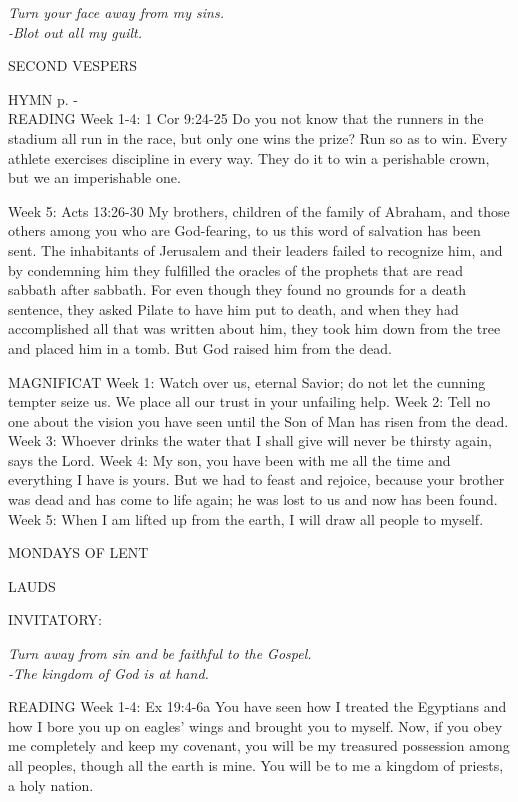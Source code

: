 \begin{center}
\textit{Turn your face away from my sins.\\
-Blot out all my guilt.}\end{center}

\begin{flushleft}\normalsize{\uppercase{SECOND VESPERS\\}}\end{flushleft}
\small{\uppercase{HYMN} p. \pageref{lent:firstHymn}-\pageref{lent:lastHymn}\\}
READING
Week 1-4:  1 Cor 9:24-25  Do you not know that the runners in the stadium all run in the race, but only one wins the prize? Run so as to win. Every athlete exercises discipline in every way. They do it to win a perishable crown, but we an imperishable one.

Week 5:  Acts 13:26-30   My brothers, children of the family of Abraham, and those others among you who are God-fearing, to us this word of salvation has been sent. The inhabitants of Jerusalem and their leaders failed to recognize him, and by condemning him they fulfilled the oracles of the prophets that are read sabbath after sabbath. For even though they found no grounds for a death sentence, they asked Pilate to have him put to death, and when they had accomplished all that was written about him, they took him down from the tree and placed him in a tomb. But God raised him from the dead.

MAGNIFICAT
Week 1:	Watch over us, eternal Savior; do not let the cunning tempter seize us. We place all our trust in your unfailing help.
Week 2:	Tell no one about the vision you have seen until the Son of Man has risen from the dead.
Week 3:	Whoever drinks the water that I shall give will never be thirsty again, says the Lord.
Week 4:	My son, you have been with me all the time and everything I have is yours. But we had to feast and rejoice, because your brother was dead and has come to life again; he was lost to us and now has been found.
Week 5:	When I am lifted up from the earth, I will draw all people to myself.

	\begin{center}
\normalsize MONDAYS OF LENT
	\end{center}

\begin{flushleft}\normalsize{\uppercase{LAUDS\\}}\end{flushleft}
\small{\uppercase{INVITATORY:}}\normalsize
\begin{center}
\textit{Turn away from sin and be faithful to the Gospel.\\}
\textit{-The kingdom of God is at hand.\\}
\end{center}
READING
Week 1-4:  Ex 19:4-6a  You have seen how I treated the Egyptians and how I bore you up on eagles’ wings and brought you to myself. Now, if you obey me completely and keep my covenant, you will be my treasured possession among all peoples, though all the earth is mine. You will be to me a kingdom of priests, a holy nation.

